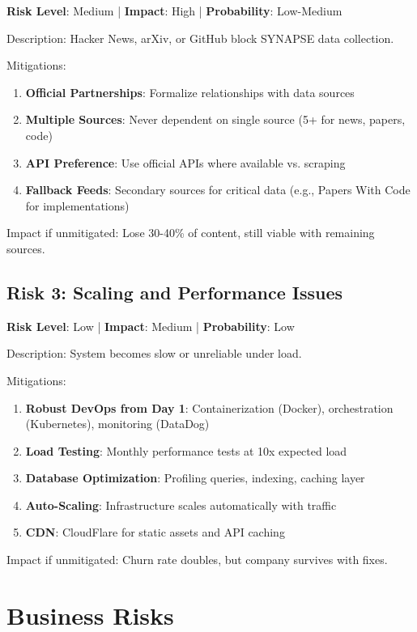 \documentclass{report}
\begin{document}
\textbf{Risk Level}: Medium | \textbf{Impact}: High | \textbf{Probability}: Low-Medium

Description: Hacker News, arXiv, or GitHub block SYNAPSE data collection.

Mitigations:
\begin{enumerate}
    \item \textbf{Official Partnerships}: Formalize relationships with data sources
    \item \textbf{Multiple Sources}: Never dependent on single source (5+ for news, papers, code)
    \item \textbf{API Preference}: Use official APIs where available vs. scraping
    \item \textbf{Fallback Feeds}: Secondary sources for critical data (e.g., Papers With Code for implementations)
\end{enumerate}

Impact if unmitigated: Lose 30-40\% of content, still viable with remaining sources.

\subsection{Risk 3: Scaling and Performance Issues}

\textbf{Risk Level}: Low | \textbf{Impact}: Medium | \textbf{Probability}: Low

Description: System becomes slow or unreliable under load.

Mitigations:
\begin{enumerate}
    \item \textbf{Robust DevOps from Day 1}: Containerization (Docker), orchestration (Kubernetes), monitoring (DataDog)
    \item \textbf{Load Testing}: Monthly performance tests at 10x expected load
    \item \textbf{Database Optimization}: Profiling queries, indexing, caching layer
    \item \textbf{Auto-Scaling}: Infrastructure scales automatically with traffic
    \item \textbf{CDN}: CloudFlare for static assets and API caching
\end{enumerate}

Impact if unmitigated: Churn rate doubles, but company survives with fixes.

\section{Business Risks}
\end{document}
